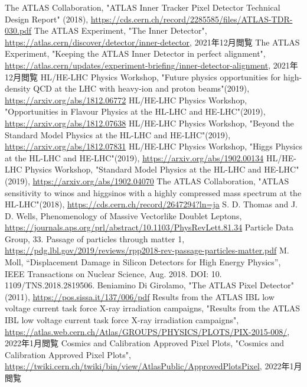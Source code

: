 \begin{thebibliography}{24}
The ATLAS Collaboration, "ATLAS Inner Tracker Pixel Detector Technical Design Report" (2018), \url{https://cds.cern.ch/record/2285585/files/ATLAS-TDR-030.pdf}
The ATLAS Experiment, "The Inner Detector", \url{https://atlas.cern/discover/detector/inner-detector}, 2021年12月閲覧
The ATLAS Experiment, "Keeping the ATLAS Inner Detector in perfect alignment", \url{https://atlas.cern/updates/experiment-briefing/inner-detector-alignment}, 2021年12月閲覧
HL/HE-LHC Physics Workshop, "Future physics opportunities for high-density QCD at the LHC with heavy-ion and proton beams"(2019), \url{https://arxiv.org/abs/1812.06772}
HL/HE-LHC Physics Workshop, "Opportunities in Flavour Physics at the HL-LHC and HE-LHC"(2019), \url{https://arxiv.org/abs/1812.07638}
HL/HE-LHC Physics Workshop, "Beyond the Standard Model Physics at the HL-LHC and HE-LHC"(2019), \url{https://arxiv.org/abs/1812.07831}
HL/HE-LHC Physics Workshop, "Higgs Physics at the HL-LHC and HE-LHC"(2019), \url{https://arxiv.org/abs/1902.00134}
HL/HE-LHC Physics Workshop, "Standard Model Physics at the HL-LHC and HE-LHC"(2019), \url{https://arxiv.org/abs/1902.04070}
The ATLAS Collaboration, "ATLAS sensitivity to winos and higgsinos with a highly compressed mass spectrum at the HL-LHC"(2018), \url{https://cds.cern.ch/record/2647294?ln=ja}
S. D. Thomas and J. D. Wells, Phenomenology of Massive Vectorlike Doublet Leptons, \url{https://journals.aps.org/prl/abstract/10.1103/PhysRevLett.81.34}
Particle Data Group, 33. Passage of particles through matter 1,
\url{https://pdg.lbl.gov/2019/reviews/rpp2018-rev-passage-particles-matter.pdf}
M. Moll, “Displacement Damage in Silicon Detectors for High Energy Physics”, IEEE Transactions on Nuclear Science, Aug. 2018. DOI: 10. 1109/TNS.2018.2819506.
Beniamino Di Girolamo, "The ATLAS Pixel Detector" (2011), \url{https://pos.sissa.it/137/006/pdf}
Results from the ATLAS IBL low voltage current task force X-ray irradiation campaigns, "Results from the ATLAS IBL low voltage current task force X-ray irradiation campaigns", \url{https://atlas.web.cern.ch/Atlas/GROUPS/PHYSICS/PLOTS/PIX-2015-008/}, 2022年1月閲覧
Cosmics and Calibration Approved Pixel Plots, "Cosmics and Calibration Approved Pixel Plots", \url{https://twiki.cern.ch/twiki/bin/view/AtlasPublic/ApprovedPlotsPixel}, 2022年1月閲覧

\end{thebibliography}
